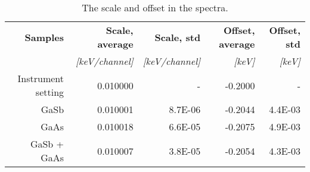 \begin{table}[htbp]
    \begin{center}
        \caption{
            The scale and offset in the spectra.
        }
        \renewcommand*{\arraystretch}{1.2}
        \label{tab:results:scale_offset}
        \begin{tabular}{rrrrr}
            \hline
            \textbf{Samples}   & \textbf{Scale, average} & \textbf{Scale, std}  & \textbf{Offset, average} & \textbf{Offset, std} \\
                               & \emph{[keV/channel]}    & \emph{[keV/channel]} & \emph{[keV]}             & \emph{[keV]}         \\
            \hline
            Instrument setting & 0.010000                & -                    & -0.2000                  & -                    \\

            GaSb               & 0.010001                & 8.7E-06              & -0.2044                  & 4.4E-03              \\
            GaAs               & 0.010018                & 6.6E-05              & -0.2075                  & 4.9E-03              \\
            GaSb + GaAs        & 0.010007                & 3.8E-05              & -0.2054                  & 4.3E-03              \\
            \hline
        \end{tabular}
    \end{center}
\end{table}

